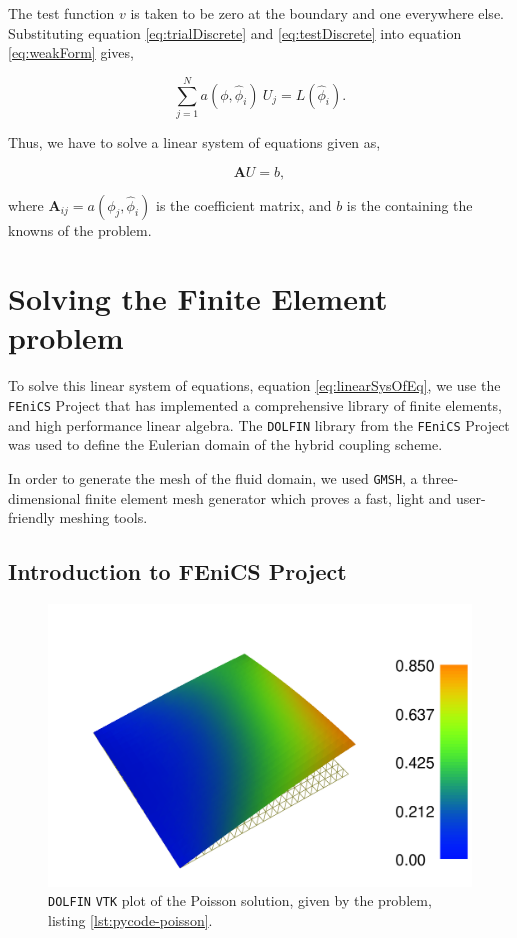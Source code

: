 The test function $v$ is taken to be zero at the boundary and one everywhere else. Substituting equation \ref{eq:trialDiscrete} and \ref{eq:testDiscrete} into equation \ref{eq:weakForm} gives,
	
	\begin{equation}
	\sum_{j=1}^N a(\phi,\hat{\phi}_i)\ U_j = L(\hat{\phi}_i).
	\end{equation}

Thus, we have to solve a linear system of equations given as,

	\begin{equation}
	\mathbf{A}U = b,
	\label{eq:linearSysOfEq}
	\end{equation}	
	
where $\mathbf{A}_{ij} = a(\phi_j,\hat{\phi}_i)$ is the coefficient matrix, and $b$ is the  containing the knowns of the problem.
 	
\section{Solving the Finite Element problem}

To solve this linear system of equations, equation \ref{eq:linearSysOfEq}, we use the \texttt{FEniCS} Project that has implemented a comprehensive library of finite elements, and high performance linear algebra. The \texttt{DOLFIN} library from the \texttt{FEniCS} Project was used to define the Eulerian domain of the hybrid coupling scheme.

In order to generate the mesh of the fluid domain, we used \texttt{GMSH}, a three-dimensional finite element mesh generator which proves a fast, light and user-friendly meshing tools.

\subsection{Introduction to FEniCS Project}

	\begin{figure}[b]
	\centering
	\includegraphics[width=0.5\linewidth]{./figures/eulerian/dolfinExampleFigure-rotated270.pdf}
	\caption{\texttt{DOLFIN} \texttt{VTK} plot of the Poisson solution, given by the problem, listing \ref{lst:pycode-poisson}.}
	\label{fig:dolfinExampleFigure}
	\end{figure}

